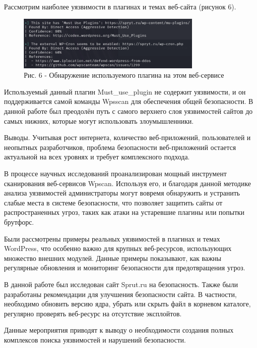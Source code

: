Рассмотрим наиболее уязвимости в плагинах и темах веб-сайта (рисунок 6).

\begin{figure}[H]
	\centering
	\includegraphics[width=0.8\textwidth]{media/ict/image39}
	\caption*{Рис. 6 - Обнаружение используемого плагина на этом веб-сервисе}
\end{figure}

\begin{multicols}{2}
Используемый данный плагин Must\_use\_plugin не содержит уязвимости, и
он поддерживается самой команды Wpsscan для обеспечения общей
безопасности. В данной работе был преодолён путь с самого верхнего слоя
уязвимостей сайтов до самых нижних, которые могут использовать
злоумышленники.

Выводы. Учитывая рост интернета, количество веб-приложений,
пользователей и неопытных разработчиков, проблема безопасности
веб-приложений остается актуальной на всех уровнях и требует
комплексного подхода.

В процессе научных исследований проанализирован мощный инструмент
сканирования веб-сервисов Wpscan. Используя его, и благодаря данной
методике анализа уязвимостей администраторы могут вовремя обнаружить и
устранить слабые места в системе безопасности, что позволяет защитить
сайты от распространенных угроз, таких как атаки на устаревшие плагины
или попытки брутфорс.

Были рассмотрены примеры реальных уязвимостей в плагинах и темах
WordPress, что особенно важно для крупных веб-ресурсов, использующих
множество внешних модулей. Данные примеры показывают, как важны
регулярные обновления и мониторинг безопасности для предотвращения
угроз.

В данной работе был исследован сайт Sprut.ru на безопасность. Также были
разработаны рекомендации для улучшения безопасности сайта. В частности,
необходимо обновить версию ядра, убрать или скрыть файл в корневом
каталоге, регулярно проверять веб-ресурс на отсутствие эксплойтов.

Данные мероприятия приводят к выводу о необходимости создания полных
комплексов поиска уязвимостей и нарушений безопасности.
\end{multicols}

